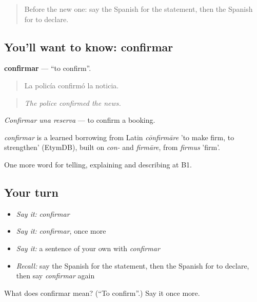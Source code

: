 \label{lesson:ES-C515-confirmar}



\begin{quote}
Before the new one: say the Spanish for the statement, then the Spanish for to declare.
\end{quote}

\subsection*{You'll want to know: confirmar}
\textbf{confirmar} — \textquotedblleft{}to confirm\textquotedblright{}.

\begin{quote}
La policía confirmó la noticia.
\end{quote}

\begin{quote}
\emph{The police confirmed the news.}
\end{quote}

\emph{Confirmar una reserva} — to confirm a booking.

\begin{cousinweb}
\emph{confirmar} is a learned borrowing from Latin \emph{cōnfirmāre} 'to make firm, to strengthen' (EtymDB), built on \emph{con-} and \emph{firmāre}, from \emph{firmus} 'firm'.
\end{cousinweb}

\begin{grammarlens}[title={What you've built}]
One more word for telling, explaining and describing at B1.
\end{grammarlens}

\subsection*{Your turn}
\begin{itemize}
\raggedright
  \item \emph{Say it:} \emph{confirmar}
  \item \emph{Say it:} \emph{confirmar}, once more
  \item \emph{Say it:} a sentence of your own with \emph{confirmar}
  \item \emph{Recall:} say the Spanish for the statement, then the Spanish for to declare, then say \emph{confirmar} again
\end{itemize}

\begin{tcolorbox}[breakable,colback=teal!4,colframe=teal!35!black,title={Before you move on}]
What does confirmar mean? (\textquotedblleft{}To confirm\textquotedblright{}.) Say it once more.
\end{tcolorbox}
